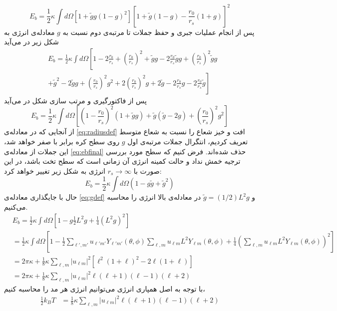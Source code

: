 \begin{equation}
E_b=\frac{1}{2}\kappa\int d\Omega\left[1+\tilde gg(1-g)^2\right]\left[1+\tilde g(1-g)-\frac{r_0}{r_s}(1+g)\right]^2
\end{equation}
پس از انجام عملیات جبری و حفظ جملات تا مرتبه‌ی دوم نسبت به $g$
معادله‌ی انرژی به شکل زیر در می‌آید
\begin{equation}
\begin{aligned}
&E_b=\frac{1}{2}\kappa\int d\Omega\left[1-2\frac{r_0}{r_s}+\left(\frac{r_0}{r_s}\right)^2+\tilde gg -2\frac{r_0}{r_s}\tilde gg+\left(\frac{r_0}{r_s}\right)^2\tilde gg\right.\\
&\left.+\tilde g^2-2\tilde gg +\left(\frac{r_0}{r_s}\right)^2g^2+2\left(\frac{r_0}{r_s}\right)^2g+2\tilde g-2\frac{r_0}{r_s}g-2\frac{r_0}{r_s}\tilde g\right]
\end{aligned}
\end{equation}
پس از فاکتورگیری و مرتب سازی شکل در می‌آید
\begin{equation}
E_b=\frac{1}{2}\kappa\int d\Omega\left[\left(1-\frac{r_0}{r_s}\right)^2(1+\tilde gg)+\tilde g(\tilde g-2g)+\left(\frac{r_0}{r_s}\right)^2g^2\right]
\label{eq:ebfinal}
\end{equation}
از آنجایی که در معادله‌ی
\ref{eq:radiusdef}
افت و خیز شعاع را نسبت به شعاع متوسط تعریف کردیم، انتگرال جملات مرتبه‌ی اول $g$ روی سطح کره برابر با صفر خواهد شد، این جملات از معادله‌ی 
\ref{eq:ebfinal}
حذف شده‌اند. فرض کنیم که سطح مورد بررسی ترجیه خمش نداد و حالت کمینه انرژی آن زمانی است که سطح تخت باشد، در این صورت با $r_s\rightarrow\infty$ انرژی به شکل زیر تغییر خواهد کرد:
\begin{equation}
E_b=\frac{1}{2}\kappa\int d\Omega\left(1-g\tilde g+\tilde g^2\right)
\label{eq:ebfinalnors}
\end{equation}
حال با جایگذاری معادله‌ی
\ref{eq:gdef}
و $\tilde g=(1/2)L^2g$ در معادله‌ی بالا انرژی را محاسبه می‌کنیم.
\begin{equation}
\begin{aligned}
&E_b=\frac{1}{2}\kappa\int d\Omega\left[1-g\frac{1}{2}L^2g+\frac{1}{4}\left(L^2g\right)^2\right]\\
&=\frac{1}{2}\kappa\int d\Omega\left[1-\frac{1}{2}\sum_{\ell',m'}u_{\ell' m'}Y_{\ell' m'} (\theta,\phi)\sum_{\ell,m}u_{\ell m}L^2Y_{\ell m} (\theta,\phi)+\frac{1}{4}\left(\sum_{\ell,m}u_{\ell m}L^2Y_{\ell m} (\theta,\phi)\right)^2\right]\\
&=2\pi \kappa+\frac{1}{8}\kappa\sum_{\ell,m}|u_{\ell m}|^2\left[\ell^2(1+\ell)^2-2\ell(1+\ell)\right]\\
&=2\pi\kappa+\frac{1}{8}\kappa\sum_{\ell,m}|u_{\ell m}|^2\ell(\ell+1)(\ell-1)(\ell+2)
\end{aligned}
\end{equation}
با توجه به اصل همپاری انرژی می‌توانیم انرژی هر مد را محاسبه کنیم،
\begin{equation}
\begin{aligned}
\frac{1}{2}k_BT&=\frac{1}{8}\kappa\sum_{\ell,m}|u_{\ell m}|^2\ell(\ell+1)(\ell-1)(\ell+2)
\end{aligned}
\end{equation}



 
 
 
 
 
 
 
 
 
 